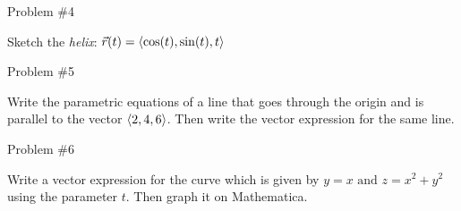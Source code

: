 \begin{sleekbox}[palCoral]{Problem \#4}
    \begin{question}\leavevmode\par\medskip
       Sketch the \textit{helix}: $\Vec{r}(t) = \left\langle \cos(t), \sin(t),t \right\rangle$
    \end{question}\leavevmode\par\medskip
    \begin{solution}\leavevmode\par\medskip
    
    \end{solution}
    
\end{sleekbox}

\begin{sleekbox}[palCoral]{Problem \#5}
    \begin{question}\leavevmode\par\medskip
       Write the parametric equations of a line that goes through the origin and is parallel to
    the vector $\left\langle 2, 4, 6 \right\rangle$. Then write the vector expression for the same line.
    \end{question}\leavevmode\par\medskip
    \begin{solution}\leavevmode\par\medskip
    
    \end{solution}
    
\end{sleekbox}

\begin{sleekbox}[palCoral]{Problem \#6}
    \begin{question}\leavevmode\par\medskip
       Write a vector expression for the curve which is given by $y=x \text{ and } z=x^2 + y^2$ using the parameter $t$. Then graph it on Mathematica.
    \end{question}\leavevmode\par\medskip
    \begin{solution}\leavevmode\par\medskip
    
    \end{solution}
    
\end{sleekbox}

